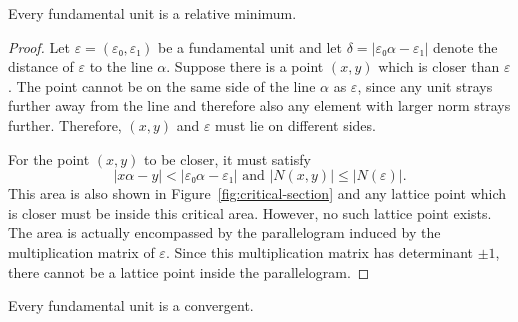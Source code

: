 \begin{proposition}
  Every fundamental unit is a relative minimum.
\end{proposition}

\begin{proof}
  Let $ε = (ε₀, ε₁)$ be a fundamental unit and let $δ = |ε₀ α - ε₁|$ denote the
  distance of $ε$ to the line $α$.
  Suppose there is a point $(x, y)$ which is closer than $ε$.
  The point cannot be on the same side of the line $α$ as $ε$,
  since any unit strays further away from the line
  and therefore also any element with larger norm strays further.
  Therefore, $(x, y)$ and $ε$ must lie on different sides.

  For the point $(x, y)$ to be closer, it must satisfy
  \[
    |x α - y| < |ε₀ α - ε₁| \text{ and } |N(x, y)| ≤ |N(ε)|.
  \]
  This area is also shown in Figure~\ref{fig:critical-section}
  and any lattice point which is closer must be inside this critical area.
  However, no such lattice point exists.
  The area is actually encompassed by the parallelogram induced by the
  multiplication matrix of $ε$.
  Since this multiplication matrix has determinant $±1$, there cannot be a
  lattice point inside the parallelogram.
\end{proof}

\begin{corollary}
  Every fundamental unit is a convergent.
\end{corollary}
